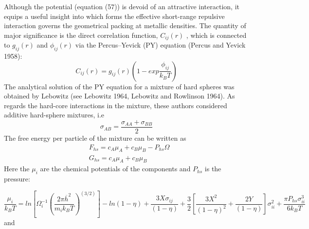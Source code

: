 \documentclass[12pt]{article}
\newcommand*{\1}{\hspace{1pt}}
\begin{document}
Although the potential (equation (57)) is devoid of an attractive interaction, it equips a 
useful insight into which forms the effective short-range repulsive interaction governs the 
geometrical packing at metallic densities. The quantity of major significance is the direct
correlation function, $C_{ij}(r)$ , which is connected to $g_{ij}(r)$ and $\phi_{ij}(r)$ via the Percus–Yevick
(PY) equation (Percus and Yevick 1958):
    \begin{equation}
        C_{ij}(r) = g_{ij}(r)\left(1 - exp\frac{\phi_{ij}}{k_{B}T}\right)          \tag*{(i , j = A , B)}
    \end{equation}
The analytical solution of the PY equation for a mixture of hard spheres was obtained by 
Lebowitz (see Lebowitz 1964, Lebowitz and Rowlinson 1964). As regards the hard-core 
interactions in the mixture, these authors considered additive hard-sphere mixtures, i.e
    \begin{equation}
        \sigma_{AB} = \frac{\sigma_{AA} + \sigma_{BB} }{2}
    \end{equation}
The free energy per particle of the mixture can be written as
\begin{align}
    &  F_{hs} = c_{A}\mu_{A} + c_{B}\mu_{B} - P _{hs}\Omega \\
    &  G_{hs} = c_{A}\mu_{A} + c_{B}\mu_{B}
    \end{align}
Here the $\mu_i$ are the chemical potentials of the components and $P _{hs}$ is the pressure:

    \begin{equation}
        \frac{\mu_i}{k_{B}T} = ln \left[\Omega ^{-1}_{i}\left(\frac{2\pi \overline{h}^2}
        {m_{i}k_{B}T}\right)^(3/2)\right] - ln (1 - \eta) + \frac{3X\sigma_{ij}}{(1 - 
        \eta)} + \frac{3}{2}\left[\frac{3X^2}{(1 - \eta )^2} + \frac{2Y}{(1 - \eta)}\right] 
        \sigma^2_{ii} + \frac{\pi P _{hs}\sigma^3_{ii}}{6k_{B}T}
    \end{equation}
and
\end{document}
